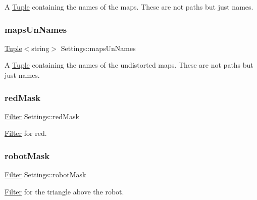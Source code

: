 A \mbox{\hyperlink{class_tuple}{Tuple}} containing the names of the maps. These are not paths but just names. 

\mbox{\label{class_settings_a1866d578ad33e56429a88617a655f9c6}} 
\subsubsection{\texorpdfstring{mapsUnNames}{mapsUnNames}}
{\footnotesize\ttfamily \mbox{\hyperlink{class_tuple}{Tuple}}$<$string$>$ Settings\+::maps\+Un\+Names}



A \mbox{\hyperlink{class_tuple}{Tuple}} containing the names of the undistorted maps. These are not paths but just names. 

\mbox{\label{class_settings_a4ded995ae1c425f92ad712d2987dce71}} 
\subsubsection{\texorpdfstring{redMask}{redMask}}
{\footnotesize\ttfamily \mbox{\hyperlink{class_filter}{Filter}} Settings\+::red\+Mask}



\mbox{\hyperlink{class_filter}{Filter}} for red. 

\mbox{\label{class_settings_aa814fd0ce673e73de3442e5bf5a26fc6}} 
\subsubsection{\texorpdfstring{robotMask}{robotMask}}
{\footnotesize\ttfamily \mbox{\hyperlink{class_filter}{Filter}} Settings\+::robot\+Mask}



\mbox{\hyperlink{class_filter}{Filter}} for the triangle above the robot. 

\mbox{\label{class_settings_add9f0e9a114013a3295ba056e19d991f}} 
